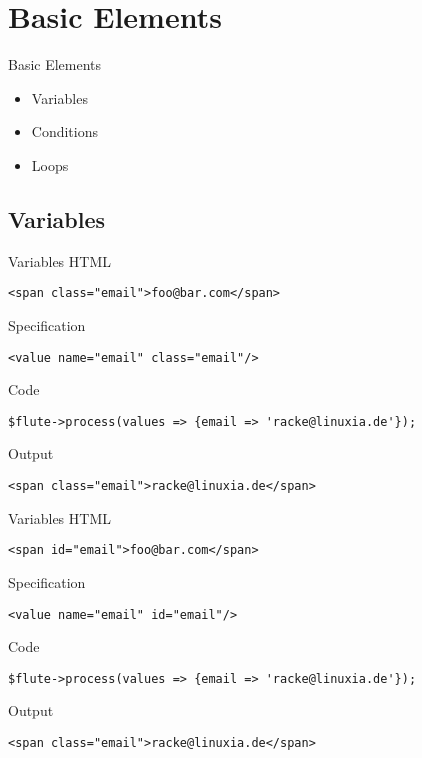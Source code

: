 \section{Basic Elements}
\begin{frame}{Basic Elements}
\begin{itemize}
\item Variables
\item Conditions
\item Loops
\end{itemize}
\end{frame}

\subsection{Variables}
\begin{frame}[fragile]{Variables}
HTML
\begin{lstlisting}
<span class="email">foo@bar.com</span>
\end{lstlisting}
Specification
\begin{lstlisting}
<value name="email" class="email"/>
\end{lstlisting}
Code
\begin{lstlisting}
$flute->process(values => {email => 'racke@linuxia.de'});
\end{lstlisting}
Output
\begin{lstlisting}
<span class="email">racke@linuxia.de</span>
\end{lstlisting}
\end{frame}

\begin{frame}[fragile]{Variables}
HTML
\begin{lstlisting}
<span id="email">foo@bar.com</span>
\end{lstlisting}
Specification
\begin{lstlisting}
<value name="email" id="email"/>
\end{lstlisting}
Code
\begin{lstlisting}
$flute->process(values => {email => 'racke@linuxia.de'});
\end{lstlisting}
Output
\begin{lstlisting}
<span class="email">racke@linuxia.de</span>
\end{lstlisting}
\end{frame}

